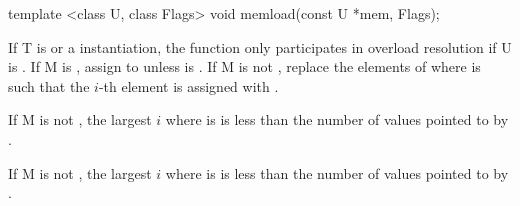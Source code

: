 \begin{itemdescr}
\begin{itemdecl}
template <class U, class Flags> void memload(const U *mem, Flags);
\end{itemdecl}
\begin{itemdescr}
  \pnum\remarks If \type T is \bool or a \mask instantiation, the function only participates in overload resolution if \type U is \bool.
  \pnum\effects If \type M is \bool, assign  to  unless  is \false.
  If \type M is not \bool, replace the elements of  where  is \true such that the $i$-th element is assigned with  \foralli[M::].

  \pnum\requires If \type M is not \bool, the largest $i$ where  is \true is less than the number of values pointed to by .
\end{itemdescr}

  \pnum\requires If \type M is not \bool, the largest $i$ where  is \true is less than the number of values pointed to by .
\end{itemdescr}

